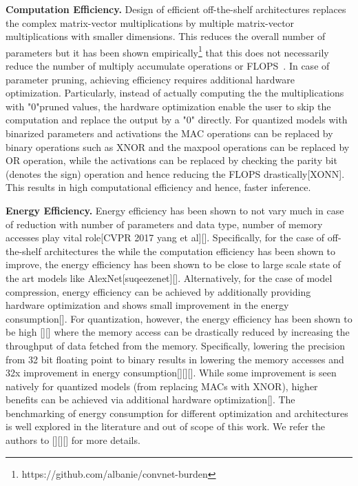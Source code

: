 



\noindent\textbf{Computation Efficiency.} Design of efficient off-the-shelf architectures replaces the complex matrix-vector multiplications by multiple matrix-vector multiplications with smaller dimensions.
This reduces the overall number of parameters but it has been shown empirically\footnote{https://github.com/albanie/convnet-burden} that this does not necessarily reduce the number of multiply accumulate operations or FLOPS~\cite{article}.
In case of parameter pruning, achieving efficiency requires additional hardware optimization. Particularly, instead of actually computing the the multiplications with "0"pruned values, the hardware optimization enable the user to skip the computation and replace the output by a "0" directly.
For quantized models with binarized parameters and activations the MAC operations can be replaced by binary operations such as XNOR and the maxpool operations can be replaced by OR operation, while the activations can be replaced by checking the parity bit (denotes the sign) operation and hence reducing the FLOPS drastically[XONN].
This results in high computational efficiency and hence, faster inference.


\noindent\textbf{Energy Efficiency.} Energy efficiency has been shown to not vary much in case of reduction with number of parameters and data type, number of memory accesses play vital role[CVPR 2017 yang et al][].
Specifically, for the case of off-the-shelf architectures the while the computation efficiency has been shown to improve, the energy efficiency has been shown to be close to large scale state of the art models like AlexNet[suqeezenet][].
Alternatively, for the case of model compression, energy efficiency can be achieved by additionally providing hardware optimization and shows small improvement in the energy consumption[].
For quantization, however, the energy efficiency has been shown to be high [][] where the memory access can be drastically reduced by increasing the throughput of data fetched from the memory.
Specifically, lowering the precision from 32 bit floating point to binary results in lowering the memory accesses and 32x improvement in energy consumption[][][].
While some improvement is seen natively for quantized models (from replacing MACs with XNOR), higher benefits can be achieved via additional hardware optimization[].
The benchmarking of energy consumption for different optimization and architectures is well explored in the literature and out of scope of this work. We refer the authors to [][][] for more details.

